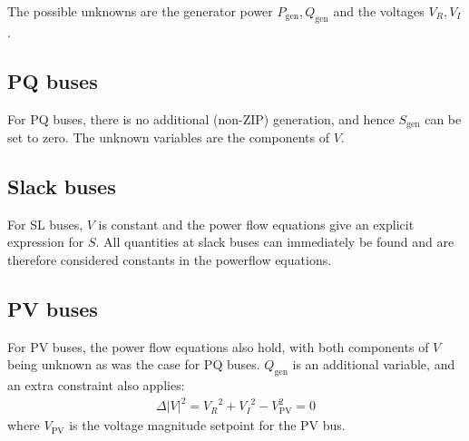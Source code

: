\documentclass[11pt]{article}
\newcommand{\Vr}{{V_R}}
\newcommand{\Vi}{{V_I}}
\begin{document}
The possible unknowns are the generator power $P_\text{gen}, Q_\text{gen}$ and the voltages $\Vr, \Vi$.

\subsection{PQ buses}
For PQ buses, there is no additional (non-ZIP) generation, and hence $S_{\text{gen}}$ can be set to zero. The unknown variables are the components of $V$.
\subsection{Slack buses}
For SL buses, $V$ is constant and the power flow equations give an explicit expression for $S$. All quantities at slack buses can immediately be found and are therefore considered constants in the powerflow equations.
\subsection{PV buses}
For PV buses, the power flow equations also hold, with both components of $V$ being unknown as was the case for PQ buses. $Q_{\text{gen}}$ is an additional variable, and an extra constraint also applies:
\begin{align}
\Delta |V|^2 = \Vr^2 + \Vi^2 - V_\text{PV}^2 = 0
\label{EQ_POWERFLOW_PV_CONSTRAINT}
\end{align}
where $V_{\text{PV}}$ is the voltage magnitude setpoint for the PV bus.
\end{document}
